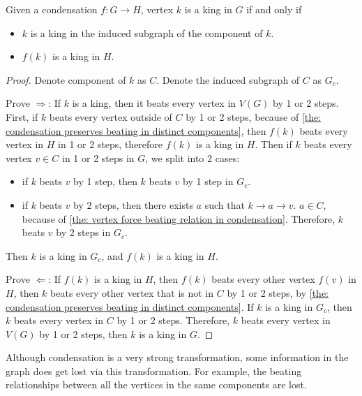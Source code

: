 \begin{corollary}\label{the: condensation preserves king}
  Given a condensation \(f: G \to H\),
  vertex \(k\) is a king in \(G\) if and only if
  \begin{itemize}
    \item \(k\) is a king in the
      induced subgraph of the component of \(k\).
    \item \(f(k)\) is a king in \(H\).
  \end{itemize}
\end{corollary}

\begin{proof}
  Denote component of \(k\) as \(C\).
  Denote the induced subgraph of \(C\) as \(G_c\).

  Prove \(\Rightarrow \):
  If \(k\) is a king, then it beats every vertex in \(V(G)\)
  by 1 or 2 steps.
  First, if \(k\) beats every vertex outside of \(C\) by
  1 or 2 steps,
  because of \cref{the: condensation preserves beating in distinct components},
  then \(f(k)\) beats every vertex in \(H\) in 1 or 2 steps,
  therefore \(f(k)\) is a king in \(H\).
  Then if \(k\) beats every vertex \(v \in C\)
  in 1 or 2 steps in \(G\), we split into 2 cases:
  \begin{itemize}
    \item if \(k\) beats \(v\) by 1 step, then
      \(k\) beats \(v\) by 1 step in \(G_c\).
    \item if \(k\) beats \(v\) by 2 steps, then
      there exists \(a\) such that \(k \to a \to v\).
      \(a \in C\), because of
      \cref{the: vertex force beating relation in condensation}.
      Therefore, \(k\) beats \(v\) by 2 steps in \(G_c\).
  \end{itemize}
  Then \(k\) is a king in \(G_c\),
  and \(f(k)\) is a king in \(H\).

  Prove \(\Leftarrow \):
  If \(f(k)\) is a king in \(H\),
  then \(f(k)\) beats every other vertex \(f(v)\) in \(H\),
  then \(k\) beats every other vertex that is not in \(C\)
  by 1 or 2 steps, by \cref{the: condensation preserves beating in distinct components}.
  If \(k\) is a king in \(G_c\),
  then \(k\) beats every vertex in \(C\) by 1 or 2 steps.
  Therefore, \(k\) beats every vertex in \(V(G)\) by 1 or 2 steps,
  then \(k\) is a king in \(G\).
\end{proof}

Although condensation is a very strong transformation,
some information in the graph does get lost via this transformation.
For example, the beating relationships between all the vertices
in the same components are lost.


